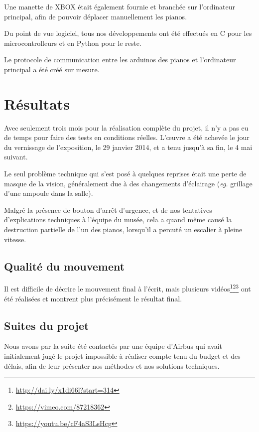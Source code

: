 \documentclass[french,A4paper,]{book}
\begin{document}
Une manette de XBOX était également fournie et branchée sur l'ordinateur
principal, afin de pouvoir déplacer manuellement les pianos.

Du point de vue logiciel, tous nos développements ont été effectués en C
pour les microcontrolleurs et en Python pour le reste.

Le protocole de communication entre les arduinos des pianos et
l'ordinateur principal a été créé sur mesure.

\section{Résultats}\label{ruxe9sultats}

Avec seulement trois mois pour la réalisation complète du projet, il n'y
a pas eu de temps pour faire des tests en conditions réelles. L'œuvre a
été achevée le jour du vernissage de l'exposition, le 29 janvier 2014,
et a tenu jusqu'à sa fin, le 4 mai suivant.

Le seul problème technique qui s'est posé à quelques reprises était une
perte de masque de la vision, généralement due à des changements
d'éclairage (\emph{eg.} grillage d'une ampoule dans la salle).

Malgré la présence de bouton d'arrêt d'urgence, et de nos tentatives
d'explications techniques à l'équipe du musée, cela a quand même causé
la destruction partielle de l'un des pianos, lorsqu'il a percuté un
escalier à pleine vitesse.

\subsection{Qualité du mouvement}\label{qualituxe9-du-mouvement}

Il est difficile de décrire le mouvement final à l'écrit, mais plusieurs
vidéos\footnote{\url{http://dai.ly/x1di66l?start=314}}\footnote{\url{https://vimeo.com/87218362}}\footnote{\url{https://youtu.be/cF4aS3LsHcg}}
ont été réalisées et montrent plus précisément le résultat final.

\subsection{Suites du projet}\label{suites-du-projet}

Nous avons par la suite été contactés par une équipe d'Airbus qui avait
initialement jugé le projet impossible à réaliser compte tenu du budget
et des délais, afin de leur présenter nos méthodes et nos solutions
techniques.
\end{document}
